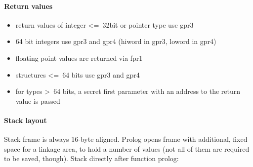 \paragraph{Return values}

\begin{itemize}
\item return values of integer \textless=\ 32bit or pointer type use gpr3
\item 64 bit integers use gpr3 and gpr4 (hiword in gpr3, loword in gpr4)
\item floating point values are returned via fpr1
\item structures \textless=\ 64 bits use gpr3 and gpr4
\item for types \textgreater\ 64 bits, a secret first parameter with an address to the return value is passed
\end{itemize}


\paragraph{Stack layout}

Stack frame is always 16-byte aligned. Prolog opens frame with additional, fixed space for a linkage area, to hold a number of values (not all of them are required to be saved, though). Stack directly after function prolog:\\

